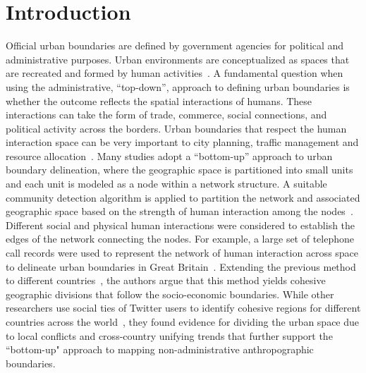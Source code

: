 \documentclass[]{tGIS2e}
\begin{document}
\section{Introduction}
Official urban boundaries are defined by government agencies for political and administrative purposes.
Urban environments are conceptualized as spaces that are recreated and formed by human activities~\citep{schliephake}.
A fundamental question when using the administrative, ``top-down'', approach to defining urban boundaries is whether the outcome reflects the spatial interactions of humans.
These interactions can take the form of trade, commerce, social connections, and political activity across the borders.
Urban boundaries that respect the human interaction space can be very important to city planning, traffic management and resource allocation~\citep{gao2014, jiang2015,liu2015,long2015}.
Many studies adopt a ``bottom-up'' approach to urban boundary delineation, where the geographic space is partitioned into small units and each unit is modeled as a node within a network structure.
A suitable community detection algorithm is applied to partition the network and associated geographic space based on the strength of human interaction among the nodes~\citep{lancichinetti2009}.
Different social and physical human interactions were considered to establish the edges of the network connecting the nodes.
For example, a large set of telephone call records were used to represent the network of human interaction across space to delineate urban boundaries in Great Britain~\citep{ratti2010}.
Extending the previous method to different countries~\citep{sobolevsky2013}, the authors argue that this method yields cohesive geographic divisions that follow the socio-economic boundaries.
While other researchers use social ties of Twitter users to identify cohesive regions for different countries across the world~\citep{kallus2015}, they found evidence for dividing the urban space due to local conflicts and cross-country unifying trends that further support the ``bottom-up" approach to mapping non-administrative anthropographic boundaries.
\end{document}
